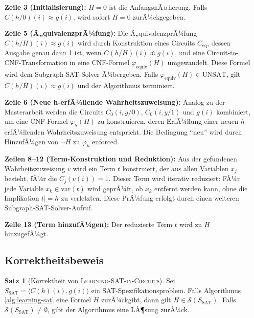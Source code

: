 ﻿\documentclass[a4paper,12pt]{article}
\theoremstyle{definition}
\newtheorem{satz}{Satz}
\begin{document}
\textbf{Zeile 3 (Initialisierung):} $H = 0$ ist die AnfangsnÃ¤herung. Falls $C(h/0)(i) \approx g(i)$, wird sofort $H = 0$ zurÃ¼ckgegeben.

\textbf{Zeile 5 (Ã„quivalenzprÃ¼fung):} Die Ã„quivalenzprÃ¼fung $C(h/H)(i) \approx g(i)$ wird durch Konstruktion eines Circuits $C_{\text{eq}}$, dessen Ausgabe genau dann 1 ist, wenn $C(h/H)(i) \not\approx g(i)$, und eine Circuit-to-CNF-Transformation in eine CNF-Formel $\varphi_{\text{equiv}}(H)$ umgewandelt. Diese Formel wird dem Subgraph-SAT-Solver Ã¼bergeben. Falls $\varphi_{\text{equiv}}(H) \in \text{UNSAT}$, gilt $C(h/H)(i) \approx g(i)$ und der Algorithmus terminiert.

\textbf{Zeile 6 (Neue h-erfÃ¼llende Wahrheitszuweisung):} Analog zu der Masterarbeit werden die Circuits $C_0(i, y/0)$, $C_0(i, y/1)$ und $g(i)$ kombiniert, um eine CNF-Formel $\varphi_h(H)$ zu konstruieren, deren ErfÃ¼llung einer neuen $h$-erfÃ¼llenden Wahrheitszuweisung entspricht. Die Bedingung ``neu'' wird durch HinzufÃ¼gen von $\neg H$ zu $\varphi_h$ enforced.

\textbf{Zeilen 8--12 (Term-Konstruktion und Reduktion):} Aus der gefundenen Wahrheitszuweisung $v$ wird ein Term $t$ konstruiert, der aus allen Variablen $x_j$ besteht, fÃ¼r die $C_j(v(i)) = 1$. Dieser Term wird iterativ reduziert: FÃ¼r jede Variable $x_k \in \text{var}(t)$ wird geprÃ¼ft, ob $x_k$ entfernt werden kann, ohne die Implikation $t |= h$ zu verletzten. Diese PrÃ¼fung erfolgt durch einen weiteren Subgraph-SAT-Solver-Aufruf.

\textbf{Zeile 13 (Term hinzufÃ¼gen):} Der reduzierte Term $t$ wird zu $H$ hinzugefÃ¼gt.

\subsection{Korrektheitsbeweis}

\begin{satz}[Korrektheit von \textsc{Learning-SAT-in-Circuits}]
    Sei $S_{\text{SAT}} = \langle C(h)(i), g(i) \rangle$ ein SAT-Spezifikationsproblem. Falls Algorithmus \ref{alg:learning-sat} eine Formel $H$ zurÃ¼ckgibt, dann gilt $H \in \mathcal{S}(S_{\text{SAT}})$. Falls $\mathcal{S}(S_{\text{SAT}}) \neq \emptyset$, gibt der Algorithmus eine LÃ¶sung zurÃ¼ck.
\end{satz}
\end{document}
